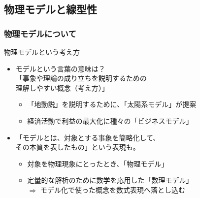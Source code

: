 \documentclass[12pt, dvipdfmx]{beamer}
\begin{document}
\subsection{物理モデルと線型性}
\begin{frame}
	\frametitle{物理モデルについて}
	\begin{exampleblock}{物理モデルという考え方}
		\begin{itemize}
			\item モデルという言葉の意味は？\\
			\alert{「事象や理論の成り立ちを説明するための\\理解しやすい概念（考え方）」}
			\begin{itemize}
				\item 「地動説」を説明するために、「太陽系モデル」が提案
				\item 経済活動で利益の最大化に種々の「ビジネスモデル」
			\end{itemize}
			\item \alert{「モデルとは、対象とする事象を簡略化して、\\その本質を表したもの」}という表現も。
			\begin{itemize}
				\item 対象を物理現象にとったとき、「物理モデル」
				\item 定量的な解析のために数学を応用した「数理モデル」\\
				$\Rightarrow$ モデル化で使った概念を数式表現へ落とし込む
			\end{itemize}
		\end{itemize}
	\end{exampleblock}
\end{frame}
\end{document}
